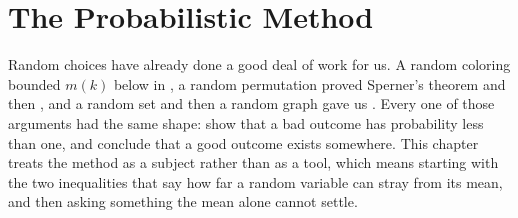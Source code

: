 \chapter{The Probabilistic Method} \label{Ch3:CH}
\thispagestyle{empty}

Random choices have already done a good deal of work for us. A random coloring bounded $m(k)$ below in , a random permutation proved Sperner's theorem and then , and a random set and then a random graph gave us . Every one of those arguments had the same shape: show that a bad outcome has probability less than one, and conclude that a good outcome exists somewhere. This chapter treats the method as a subject rather than as a tool, which means starting with the two inequalities that say how far a random variable can stray from its mean, and then asking something the mean alone cannot settle.



